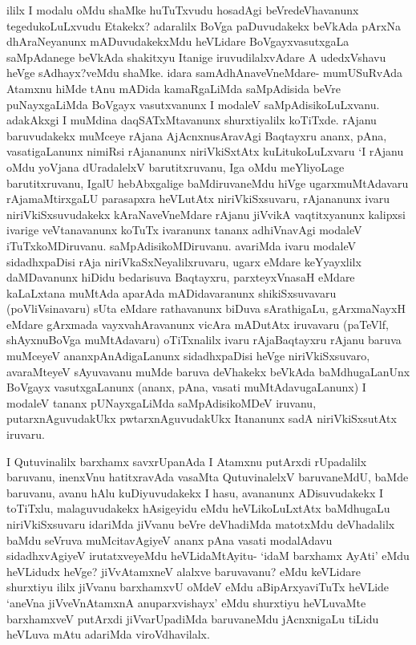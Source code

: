 
\begin{artha}
ililx I modalu oMdu shaMke huTuTxvudu hosadAgi beVredeVhavanunx tegedukoLuLxvudu Etakekx? adaralilx BoVga paDuvudakekx beVkAda pArxNa dhAraNeyanunx mADuvudakekxMdu heVLidare BoVgayxvasutxgaLa saMpAdanege beVkAda shakitxyu Itanige iruvudilalxvAdare A udedxVshavu heVge sAdhayx?veMdu shaMke. idara samAdhAnaveVneMdare- mumUSuRvAda Atamxnu hiMde tAnu mADida kamaRgaLiMda saMpAdisida beVre puNayxgaLiMda BoVgayx vasutxvanunx I modaleV saMpAdisikoLuLxvanu. adakAkxgi I muMdina daqSATxMtavanunx shurxtiyalilx koTiTxde. rAjanu baruvudakekx muMceye rAjana AjAcnxnusAravAgi Baqtayxru ananx, pAna, vasatigaLanunx nimiRsi rAjananunx niriVkiSxtAtx kuLitukoLuLxvaru `I rAjanu oMdu yoVjana dUradalelxV barutitxruvanu, Iga oMdu meYliyoLage barutitxruvanu, IgalU hebAbxgalige baMdiruvaneMdu hiVge ugarxmuMtAdavaru rAjamaMtirxgaLU parasapxra heVLutAtx niriVkiSxsuvaru, rAjananunx ivaru niriVkiSxsuvudakekx kAraNaveVneMdare rAjanu jiVvikA vaqtitxyanunx kalipxsi ivarige veVtanavanunx koTuTx ivaranunx tananx adhiVnavAgi modaleV iTuTxkoMDiruvanu. saMpAdisikoMDiruvanu. avariMda ivaru modaleV sidadhxpaDisi rAja niriVkaSxNeyalilxruvaru, ugarx eMdare keYyayxlilx daMDavanunx hiDidu bedarisuva Baqtayxru, parxteyxVnasaH eMdare kaLaLxtana muMtAda aparAda mADidavaranunx shikiSxsuvavaru (poVliVsinavaru) sUta eMdare rathavanunx biDuva sArathigaLu, gArxmaNayxH eMdare gArxmada vayxvahAravanunx vicAra mADutAtx iruvavaru (paTeVlf, shAyxnuBoVga muMtAdavaru) oTiTxnalilx ivaru rAjaBaqtayxru rAjanu baruva muMceyeV ananxpAnAdigaLanunx sidadhxpaDisi heVge niriVkiSxsuvaro, avaraMteyeV sAyuvavanu muMde baruva deVhakekx beVkAda baMdhugaLanUnx BoVgayx vasutxgaLanunx (ananx, pAna, vasati muMtAdavugaLanunx) I modaleV tananx pUNayxgaLiMda saMpAdisikoMDeV iruvanu, putarxnAguvudakUkx pwtarxnAguvudakUkx Itananunx sadA niriVkiSxsutAtx iruvaru. 
\end{artha}%

\begin{artha}
I Qutuvinalilx barxhamx savxrUpanAda I Atamxnu putArxdi rUpadalilx baruvanu, inenxVnu hatitxravAda vasaMta QutuvinalelxV baruvaneMdU, baMde baruvanu, avanu hAlu kuDiyuvudakekx I hasu, avananunx ADisuvudakekx I toTiTxlu, malaguvudakekx hAsigeyidu eMdu heVLikoLuLxtAtx baMdhugaLu niriVkiSxsuvaru idariMda jiVvanu beVre deVhadiMda matotxMdu deVhadalilx baMdu seVruva muMcitavAgiyeV ananx pAna vasati modalAdavu sidadhxvAgiyeV irutatxveyeMdu heVLidaMtAyitu- `idaM barxhamx AyAti' eMdu heVLidudx heVge? jiVvAtamxneV alalxve baruvavanu? eMdu keVLidare shurxtiyu ililx jiVvanu barxhamxvU oMdeV eMdu aBipArxyaviTuTx heVLide `aneVna jiVveVnAtamxnA anuparxvishayx' eMdu shurxtiyu heVLuvaMte barxhamxveV putArxdi jiVvarUpadiMda baruvaneMdu jAcnxnigaLu tiLidu heVLuva mAtu adariMda viroVdhavilalx. 	
\end{artha}%

